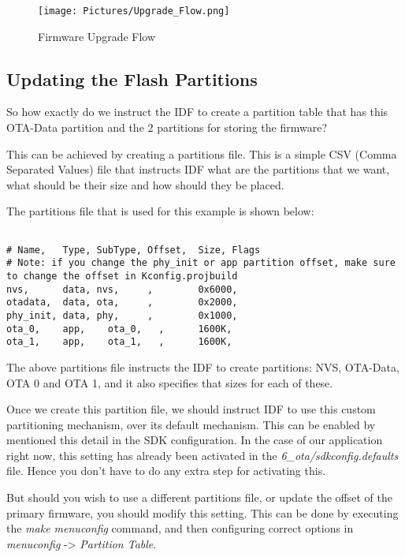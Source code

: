 \documentclass[main.tex]{subfiles}
\begin{document}
\begin{figure}[h!]
    \centering
    \texttt{[image: Pictures/Upgrade\_Flow.png]}
    \caption{Firmware Upgrade Flow}
    \label{fig:ota_workflow}
\end{figure}

\subsection{Updating the Flash Partitions}\label{sec:updating_flash_partitions}
So how exactly do we instruct the IDF to create a partition table that has this OTA-Data partition and the 2 partitions for storing the firmware?

This can be achieved by creating a partitions file. This is a simple CSV (Comma Separated Values) file that instructs IDF what are the partitions that we want, what should be their size and how should they be placed.

The partitions file that is used for this example is shown below:
\begin{verbatim}

# Name,   Type, SubType, Offset,  Size, Flags
# Note: if you change the phy_init or app partition offset, make sure to change the offset in Kconfig.projbuild
nvs,      data, nvs,     ,        0x6000,
otadata,  data, ota,     ,        0x2000,
phy_init, data, phy,     ,        0x1000,
ota_0,    app,    ota_0,   ,      1600K,
ota_1,    app,    ota_1,   ,      1600K,
\end{verbatim}

The above partitions file instructs the IDF to create partitions: NVS, OTA-Data, OTA 0 and OTA 1, and it also specifies that sizes for each of these.

Once we create this partition file, we should instruct IDF to use this custom partitioning mechanism, over its default mechanism. This can be enabled by mentioned this detail in the SDK configuration. In the case of our application right now, this setting has already been activated in the \textit{6\_ota/sdkconfig.defaults} file. Hence you don't have to do any extra step for activating this.

But should you wish to use a different partitions file, or update the offset of the primary firmware, you should modify this setting. This can be done by executing the \textit{make menuconfig} command, and then configuring correct options in \textit{menuconfig} -> \textit{Partition Table}.
\end{document}
